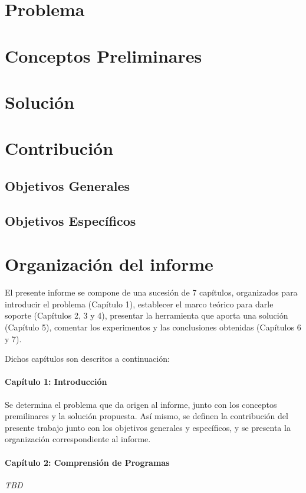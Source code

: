 \section{Problema}

\section{Conceptos Preliminares}

\section{Solución}

\section{Contribución}
\subsection{Objetivos Generales}
\subsection{Objetivos Específicos}

\section{Organización del informe}
El presente informe se compone de una sucesión de 7 capítulos, organizados para introducir
el problema (Capítulo 1), establecer el marco teórico para darle soporte (Capítulos 2, 3 y 4),
presentar la herramienta que aporta una solución (Capítulo 5), comentar los experimentos y
las conclusiones obtenidas (Capítulos 6 y 7).

Dichos capítulos son descritos a continuación:

\paragraph[]{Capítulo 1: Introducción} Se determina el problema que da origen al informe,
junto con los conceptos premilinares y la solución propuesta.
Así mismo, se definen la contribución del presente trabajo junto con los objetivos generales
y específicos, y se presenta la organización correspondiente al informe.

\paragraph[]{Capítulo 2: Comprensión de Programas} \textit{TBD}

